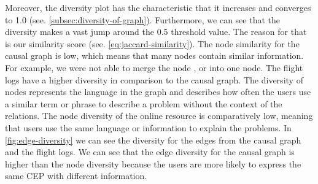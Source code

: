 Moreover, the diversity plot has the characteristic that it increases and converges to 1.0 (see. \autoref{subsec:diversity-of-graph}).
Furthermore, we can see that the diversity makes a vast jump around the 0.5 threshold value.
The reason for that is our similarity score (see. \autoref{eq:jaccard-similarity}).
The node similarity for the causal graph is low, which means that many nodes contain similar information.
For example, we were not able to merge the node ,  or  into one node.
The flight logs have a higher diversity in comparison to the causal graph.
The diversity of nodes represents the language in the graph and describes how often the users use a similar term or phrase to describe a problem without the context of the relations.
The node diversity of the online resource is comparatively low, meaning that users use the same language or information to explain the problems.
In \autoref{fig:edge-diversity} we can see the diversity for the edges from the causal graph and the flight logs.
We can see that the edge diversity for the causal graph is higher than the node diversity because the users are more likely to express the same \ac{CEP} with different information.

